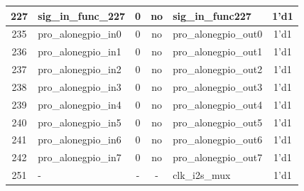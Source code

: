 \begin{longtable}[c]{|c|l|c|c|l|c|}
227  &       sig\_in\_func\_227  &  0  &   no  &        sig\_in\_func227  &               1'd1  \\\hline
235  &      pro\_alonegpio\_in0  &  0  &   no  &    pro\_alonegpio\_out0  &               1'd1  \\\hline
236  &      pro\_alonegpio\_in1  &  0  &   no  &    pro\_alonegpio\_out1  &               1'd1  \\\hline
237  &      pro\_alonegpio\_in2  &  0  &   no  &    pro\_alonegpio\_out2  &               1'd1  \\\hline
238  &      pro\_alonegpio\_in3  &  0  &   no  &    pro\_alonegpio\_out3  &               1'd1  \\\hline
239  &      pro\_alonegpio\_in4  &  0  &   no  &    pro\_alonegpio\_out4  &               1'd1  \\\hline
240  &      pro\_alonegpio\_in5  &  0  &   no  &    pro\_alonegpio\_out5  &               1'd1  \\\hline
241  &      pro\_alonegpio\_in6  &  0  &   no  &    pro\_alonegpio\_out6  &               1'd1  \\\hline
242  &      pro\_alonegpio\_in7  &  0  &   no  &    pro\_alonegpio\_out7  &               1'd1  \\\hline
251  &                        -  &  -  &    -  &           clk\_i2s\_mux  &               1'd1  \\\hline
\end{longtable}
